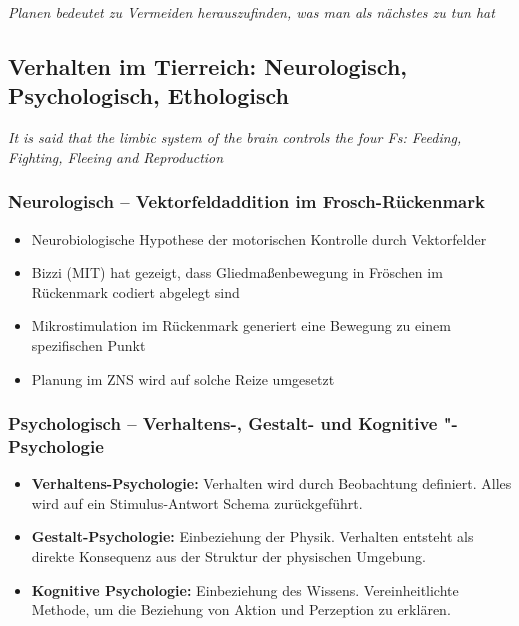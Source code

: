 \emph{Planen bedeutet zu Vermeiden herauszufinden, was man als nächstes zu tun hat}
\subsection{Verhalten im Tierreich: Neurologisch, Psychologisch, Ethologisch}
\emph{It is said that the limbic system of the brain controls the four Fs: Feeding, Fighting, Fleeing and Reproduction}
\subsubsection{Neurologisch -- Vektorfeldaddition im Frosch-Rückenmark}
\begin{itemize}
	\item Neurobiologische Hypothese der motorischen Kontrolle durch Vektorfelder
	\item Bizzi (MIT) hat gezeigt, dass Gliedmaßenbewegung in Fröschen im Rückenmark codiert abgelegt sind
	\item Mikrostimulation im Rückenmark generiert eine Bewegung zu einem spezifischen Punkt
	\item Planung im ZNS wird auf solche Reize umgesetzt
\end{itemize}

\subsubsection{Psychologisch -- Verhaltens-, Gestalt- und Kognitive "-Psychologie}
\begin{itemize}
	\item \textbf{Verhaltens-Psychologie:}
	Verhalten wird durch Beobachtung definiert.
	Alles wird auf ein Stimulus-Antwort Schema zurückgeführt.
	\item \textbf{Gestalt-Psychologie:}
	Einbeziehung der Physik.
	Verhalten entsteht als direkte Konsequenz aus der Struktur der physischen Umgebung.
	\item \textbf{Kognitive Psychologie:}
	Einbeziehung des Wissens.
	Vereinheitlichte Methode, um die Beziehung von Aktion und Perzeption zu erklären.
\end{itemize}

